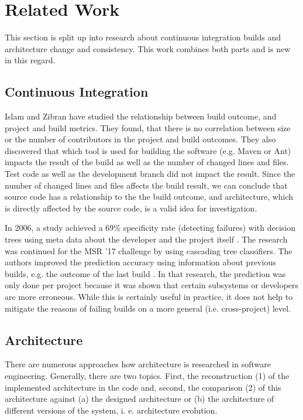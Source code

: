 \documentclass[sigplan, anonymous, review]{acmart}
\begin{document}
\section{Related Work}
\label{sec:RelWork}

This section is split up into research about continuous integration builds and architecture change and consistency. This work combines both parts and is new in this regard. 

\subsection{Continuous Integration}

Islam and Zibran \cite{FailsCorr} have studied the relationship between build outcome, and project and build metrics. They found, that there is no correlation between size or the number of contributors in the project and build outcomes. 
They also discovered that which tool is used for building the software (e.g. Maven or Ant) impacts the result of the build as well as the number of changed lines and files. Test code as well as the development branch did not impact the result. 
Since the number of changed lines and files affects the build result, we can conclude that source code has a relationship to the the build outcome, and architecture, which is directly affected by the source code, is a valid idea for investigation.

In 2006, a study achieved a 69\% specificity rate (detecting failures) with decision trees using meta data about the developer and the project itself \cite{Pred-Tree}.
The research was continued for the MSR '17 challenge by using cascading tree classifiers. The authors improved the prediction accuracy using information about previous builds, e.g. the outcome of the last build \cite{Pred-Cascade}. 
In that research, the prediction was only done per project because it was shown that certain subsystems or developers are more erroneous. While this is certainly useful in practice, it does not help to mitigate the reasons of failing builds on a more general (i.e. cross-project) level.

\subsection{Architecture}

There are numerous approaches how architecture is researched in software engineering. Generally, there are two topics. First, the reconstruction (1) of the implemented architecture in the code and, second, the comparison (2) of this architecture against (a) the designed architecture or (b) the architecture of different versions of the system, i. e. architecture evolution. 
\end{document}
